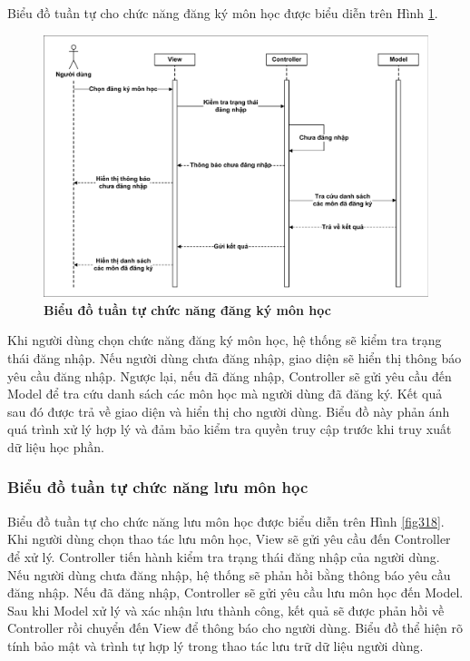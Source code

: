 \documentclass{article}
\begin{document}
	Biểu đồ tuần tự cho chức năng đăng ký môn học được biểu diễn trên Hình \ref{fig317}. 
	
	\begin{figure}[!ht]
		\centering
		\includegraphics[trim= 10pt 10pt 10pt 10pt, clip, width=16cm]{sequence_fig317.pdf}
		\caption [Biểu đồ tuần tự chức năng đăng ký môn học]{\bfseries \fontsize{12pt}{0pt}\selectfont Biểu đồ tuần tự chức năng đăng ký môn học}
		\label{fig317}
	\end{figure}
	
	 Khi người dùng chọn chức năng đăng ký môn học, hệ thống sẽ kiểm tra trạng thái đăng nhập. Nếu người dùng chưa đăng nhập, giao diện sẽ hiển thị thông báo yêu cầu đăng nhập. Ngược lại, nếu đã đăng nhập, Controller sẽ gửi yêu cầu đến Model để tra cứu danh sách các môn học mà người dùng đã đăng ký. Kết quả sau đó được trả về giao diện và hiển thị cho người dùng. Biểu đồ này phản ánh quá trình xử lý hợp lý và đảm bảo kiểm tra quyền truy cập trước khi truy xuất dữ liệu học phần.
	 
	 \subsubsection{Biểu đồ tuần tự chức năng lưu môn học}
	 
	 Biểu đồ tuần tự cho chức năng lưu môn học được biểu diễn trên Hình \ref{fig318}. Khi người dùng chọn thao tác lưu môn học, View sẽ gửi yêu cầu đến Controller để xử lý. Controller tiến hành kiểm tra trạng thái đăng nhập của người dùng. Nếu người dùng chưa đăng nhập, hệ thống sẽ phản hồi bằng thông báo yêu cầu đăng nhập. Nếu đã đăng nhập, Controller sẽ gửi yêu cầu lưu môn học đến Model. Sau khi Model xử lý và xác nhận lưu thành công, kết quả sẽ được phản hồi về Controller rồi chuyển đến View để thông báo cho người dùng. Biểu đồ thể hiện rõ tính bảo mật và trình tự hợp lý trong thao tác lưu trữ dữ liệu người dùng.
	 
\end{document}
